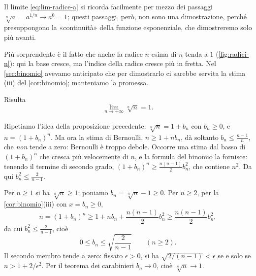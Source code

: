 Il limite \eqref{eq:lim-radice-a} si ricorda facilmente per mezzo dei passaggi
$\sqrt[n]{a}=a^{1/n}\to a^{0}=1$; questi passaggi, però, non sono una dimostrazione,
perché presuppongono la «continuità» della funzione esponenziale, che dimostreremo solo
più avanti.

Più sorprendente è il fatto che anche la radice $n$-esima di $n$ tenda a $1$
(\cref{fig:radici-n}): qui la base cresce, ma l'indice della radice cresce più in fretta. Nel \cref{sec:binomio} avevamo
anticipato che per dimostrarlo ci sarebbe servita la stima (iii) del
\cref{cor:binomio}; manteniamo la promessa.

\begin{proposizione}\label{prop:radice-n-n}
Risulta
\begin{equation}\label{eq:lim-radice-n}
  \lim_{n\to+\infty}\sqrt[n]{n}=1 .
\end{equation}
\end{proposizione}

\begin{schema}
\end{schema}

\begin{strategia}
Ripetiamo l'idea della proposizione precedente: $\sqrt[n]n=1+b_{n}$ con $b_{n}\ge0$, e
$n=(1+b_{n})^{n}$. Ma ora la stima di Bernoulli, $n\ge1+nb_{n}$, dà soltanto
$b_{n}\le\frac{n-1}{n}$, che \emph{non} tende a zero: Bernoulli è troppo debole. Occorre
una stima dal basso di $(1+b_{n})^{n}$ che cresca più velocemente di $n$, e la formula del
binomio la fornisce: tenendo il termine di secondo grado,
$(1+b_{n})^{n}\ge\frac{n(n-1)}{2}b_{n}^{2}$, che contiene $n^{2}$. Da qui
$b_{n}^{2}\le\frac2{n-1}$.
\end{strategia}

\begin{dimostrazione}
Per $n\ge1$ si ha $\sqrt[n]n\ge1$; poniamo $b_{n}=\sqrt[n]n-1\ge0$. Per $n\ge2$, per la
\cref{cor:binomio}(iii) con $x=b_{n}\ge0$,
\begin{equation}\label{eq:radice-n-binomio}
  n=(1+b_{n})^{n}\ge1+nb_{n}+\frac{n(n-1)}{2}b_{n}^{2}\ge\frac{n(n-1)}{2}b_{n}^{2},
\end{equation}
da cui $b_{n}^{2}\le\frac{2}{n-1}$, cioè
\begin{equation}\label{eq:radice-n-stima}
  0\le b_{n}\le\sqrt{\frac{2}{n-1}} \qquad (n\ge2).
\end{equation}
Il secondo membro tende a zero: fissato $\epsilon>0$, si ha
$\sqrt{2/(n-1)}<\epsilon$ se e solo se $n>1+2/\epsilon^{2}$. Per il teorema dei
carabinieri $b_{n}\to0$, cioè $\sqrt[n]n\to1$.
\end{dimostrazione}

